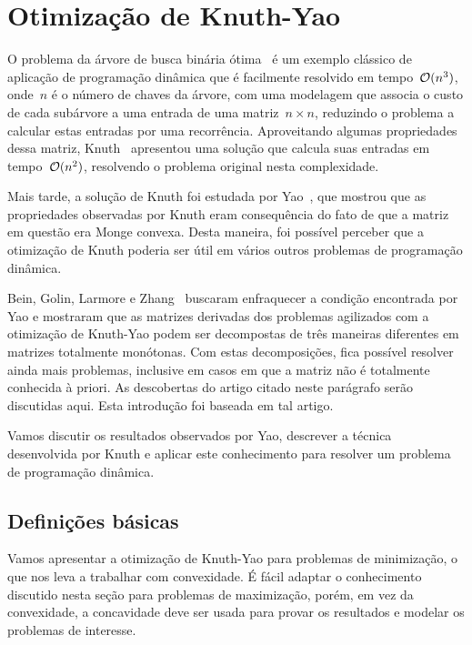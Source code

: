 \chapter{Otimização de Knuth-Yao}
\label{KY}


O problema da árvore de busca binária ótima~\cite{CLRS} é um exemplo clássico de aplicação de programação dinâmica que é facilmente resolvido em tempo~$\mathcal{O}(n^3)$, onde~$n$ é o número de chaves da árvore, com uma modelagem que associa o custo de cada subárvore a uma entrada de uma matriz~${ n \times n }$, reduzindo o problema a calcular estas entradas por uma recorrência. Aproveitando algumas propriedades dessa matriz, Knuth~\cite{Knuth:1971} apresentou uma solução que calcula suas entradas em tempo~$\mathcal{O}(n^2)$, resolvendo o problema original nesta complexidade.

Mais tarde, a solução de Knuth foi estudada por Yao~\cite{Yao:1980,Yao:1982}, que mostrou que as propriedades observadas por Knuth eram consequência do fato de que a matriz em questão era Monge convexa. Desta maneira, foi possível perceber que a otimização de Knuth poderia ser útil em vários outros problemas de programação dinâmica. 

Bein, Golin, Larmore e Zhang~\cite{Bein:2009} buscaram enfraquecer a condição encontrada por Yao e mostraram que as matrizes derivadas dos problemas agilizados com a otimização de Knuth-Yao podem ser decompostas de três maneiras diferentes em matrizes totalmente monótonas. Com estas decomposições, fica possível resolver ainda mais problemas, inclusive em casos em que a matriz não é totalmente conhecida à priori. As descobertas do artigo citado neste parágrafo serão discutidas aqui. Esta introdução foi baseada em tal artigo.

Vamos discutir os resultados observados por Yao, descrever a técnica desenvolvida por Knuth e aplicar este conhecimento para resolver um problema de programação dinâmica.


\section{Definições básicas} \label{KY:defs}

Vamos apresentar a otimização de Knuth-Yao para problemas de minimização, o que nos leva a trabalhar com convexidade. É fácil adaptar o conhecimento discutido nesta seção para problemas de maximização, porém, em vez da convexidade, a concavidade deve ser usada para provar os resultados e modelar os problemas de interesse.


